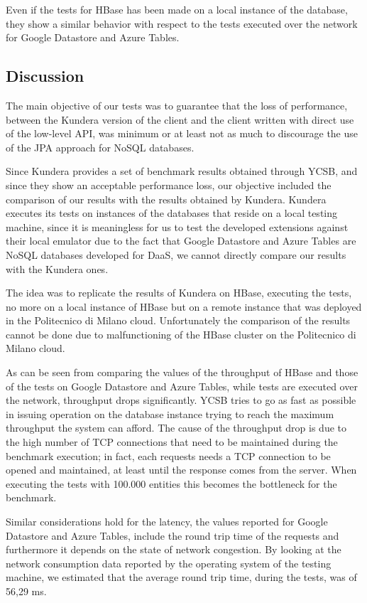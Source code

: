 \noindent Even if the tests for HBase has been made on a local instance of the database, they show a similar behavior with respect to the tests executed over the network for Google Datastore and Azure Tables.

\subsection{Discussion}
\label{sec:discussion}
The main objective of our tests was to guarantee that the loss of performance, between the Kundera version of the client and the client written with direct use of the low-level API, was minimum or at least not as much to discourage the use of the JPA approach for NoSQL databases.

\noindent Since Kundera provides a set of benchmark results obtained through YCSB, and since they show an acceptable performance loss, our objective included the comparison of our results with the results obtained by Kundera. Kundera executes its tests on instances of the databases that reside on a local testing machine, since it is meaningless for us to test the developed extensions against their local emulator due to the fact that Google Datastore and Azure Tables are NoSQL databases developed for DaaS, we cannot directly compare our results with the Kundera ones.

\noindent The idea was to replicate the results of Kundera on HBase, executing the tests, no more on a local instance of HBase but on a remote instance that was deployed in the Politecnico di Milano cloud. Unfortunately the comparison of the results cannot be done due to malfunctioning of the HBase cluster on the Politecnico di Milano cloud.

\newparagraph As can be seen from comparing the values of the throughput of HBase and those of the tests on Google Datastore and Azure Tables, while tests are executed over the network, throughput drops significantly.
YCSB tries to go as fast as possible in issuing operation on the database instance trying to reach the maximum throughput the system can afford. The cause of the throughput drop is due to the high number of TCP connections that need to be maintained during the benchmark execution; in fact, each requests needs a TCP connection to be opened and maintained, at least until the response comes from the server. When executing the tests with 100.000 entities this becomes the bottleneck for the benchmark.

\noindent Similar considerations hold for the latency, the values reported for Google Datastore and Azure Tables, include the round trip time of the requests and furthermore it depends on the state of network congestion. By looking at the network consumption data reported by the operating system of the testing machine, we estimated that the average round trip time, during the tests, was of 56,29 ms.

